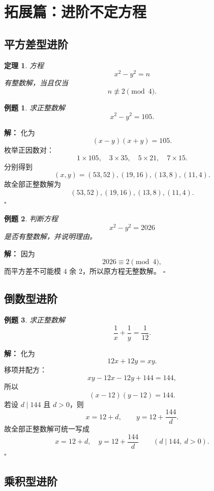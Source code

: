 \documentclass[11pt,a4paper,fontset=fandol]{ctexart}
\theoremstyle{formaltheorem}
\newtheorem{theorem}{定理}[section]
\theoremstyle{formalexample}
\newtheorem{example}{例题}[section]
\newenvironment{solution}{\par\noindent\textbf{解：}}{\hfill$\square$\par}
\begin{document}
\section{拓展篇：进阶不定方程}

\subsection{平方差型进阶}

\begin{theorem}
方程
\[
x^2-y^2=n
\]
有整数解，当且仅当
\[
n\not\equiv 2\pmod 4.
\]
\end{theorem}

\begin{example}
求正整数解
\[
x^2-y^2=105.
\]
\end{example}

\begin{solution}
化为
\[
(x-y)(x+y)=105.
\]
枚举正因数对：
\[
1\times 105,\quad 3\times 35,\quad 5\times 21,\quad 7\times 15.
\]
分别得到
\[
(x,y)=(53,52),(19,16),(13,8),(11,4).
\]
故全部正整数解为
\[
\boxed{(53,52),(19,16),(13,8),(11,4)}.
\]
\end{solution}

\begin{example}
判断方程
\[
x^2-y^2=2026
\]
是否有整数解，并说明理由。
\end{example}

\begin{solution}
因为
\[
2026\equiv 2\pmod 4,
\]
而平方差不可能模 $4$ 余 $2$，所以原方程无整数解。
\end{solution}

\subsection{倒数型进阶}

\begin{example}
求正整数解
\[
\frac1x+\frac1y=\frac1{12}.
\]
\end{example}

\begin{solution}
化为
\[
12x+12y=xy.
\]
移项并配方：
\[
xy-12x-12y+144=144,
\]
所以
\[
(x-12)(y-12)=144.
\]
若设 $d\mid 144$ 且 $d>0$，则
\[
x=12+d,\qquad y=12+\frac{144}{d}.
\]
故全部正整数解可统一写成
\[
\boxed{x=12+d,\quad y=12+\frac{144}{d}\qquad (d\mid 144,\ d>0).}
\]
\end{solution}

\subsection{乘积型进阶}
\end{document}
